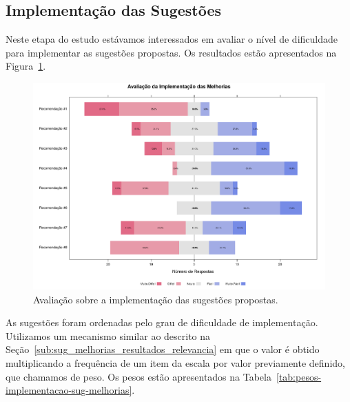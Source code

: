\subsection{Implementação das Sugestões}
\label{sub:sug_melhorias_resultados_implementacao}

Neste etapa do estudo estávamos interessados em avaliar o nível de dificuldade
para implementar as sugestões propostas. Os resultados estão apresentados na
Figura~\ref{fig:plot_likert_avaliacao_implementacao_melhorias}.

\begin{figure}[htpb]
    \centering
    \includegraphics[width=1.1\linewidth]{chapter-sugestoes-melhorias-fgrm/img/plot_likert_avaliacao_implementacao_melhorias.pdf}
    \caption{Avaliação sobre a  implementação das sugestões propostas.}
\label{fig:plot_likert_avaliacao_implementacao_melhorias}
\end{figure}

As sugestões foram ordenadas pelo grau de dificuldade de implementação.
Utilizamos um mecanismo similar ao descrito na
Seção~\ref{sub:sug_melhorias_resultados_relevancia} em que o valor é obtido
multiplicando a frequência de um item da escala por valor previamente definido,
que chamamos de peso. Os pesos estão apresentados na
Tabela~\ref{tab:pesos-implementacao-sug-melhorias}.

\begin{table}[htpb]
\centering
{}
\caption{Pesos utilizados no ranqueamento das sugestões de melhorias}
\label{tab:pesos-implementacao-sug-melhorias}
\end{table}

